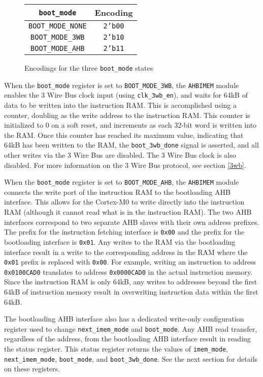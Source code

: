 \begin{figure}
	\centering
	\begin{tabular}{|c|c|}
		\hline
		\texttt{boot\_mode} & Encoding \\
		\hline
		\texttt{BOOT\_MODE\_NONE} & \texttt{2'b00} \\
		\texttt{BOOT\_MODE\_3WB} & \texttt{2'b10} \\
		\texttt{BOOT\_MODE\_AHB} & \texttt{2'b11} \\
		\hline
	\end{tabular}
	\caption{Encodings for the three \texttt{boot\_mode} states}
	\label{table:boot-boot-mode}
\end{figure}

When the \texttt{boot\_mode} register is set to \texttt{BOOT\_MODE\_3WB}, the \texttt{AHBIMEM} module enables the 3 Wire Bus clock input (using \texttt{clk\_3wb\_en}), and waits for 64kB of data to be written into the instruction RAM. This is accomplished using a counter, doubling as the write address to the instruction RAM. This counter is initialized to 0 on a soft reset, and increments as each 32-bit word is written into the RAM. Once this counter has reached its maximum value, indicating that 64kB has been written to the RAM, the \texttt{boot\_3wb\_done} signal is asserted, and all other writes via the 3 Wire Bus are disabled. The 3 Wire Bus clock is also disabled. For more information on the 3 Wire Bus protocol, see section \ref{3wb}.

When the \texttt{boot\_mode} register is set to \texttt{BOOT\_MODE\_AHB}, the \texttt{AHBIMEM} module connects the write port of the instruction RAM to the bootloading AHB interface. This allows for the Cortex-M0 to write directly into the instruction RAM (although it cannot read what is in the instruction RAM). The two AHB interfaces correspond to two separate AHB slaves with their own address prefixes. The prefix for the instruction fetching interface is \texttt{0x00} and the prefix for the bootloading interface is \texttt{0x01}. Any writes to the RAM via the bootloading interface result in a write to the corresponding address in the RAM where the \texttt{0x01} prefix is replaced with \texttt{0x00}. For example, writing an instruction to address \texttt{0x0100CAD0} translates to address \texttt{0x0000CAD0} in the actual instruction memory. Since the instruction RAM is only 64kB, any writes to addresses beyond the first 64kB of instruction memory result in overwriting instruction data within the first 64kB.

The bootloading AHB interface also has a dedicated write-only configuration register used to change \texttt{next\_imem\_mode} and \texttt{boot\_mode}. Any AHB read transfer, regardless of the address, from the bootloading AHB interface result in reading the status register. This status register returns the values of \texttt{imem\_mode}, \texttt{next\_imem\_mode}, \texttt{boot\_mode}, and \texttt{boot\_3wb\_done}. See the next section for details on these registers.

